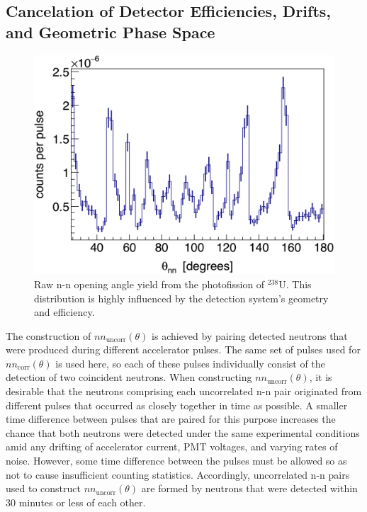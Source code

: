 \subsection{Cancelation of Detector Efficiencies, Drifts, and Geometric Phase Space}
\label{subsec:SPDPCancelation}
\begin{figure}[h]
\includegraphics[width=\figsize\textwidth]{./DetAcceptance.png}
\caption{Raw n-n opening angle yield from the photofission of $^{238}$U. 
This distribution is highly influenced by the detection system's geometry and efficiency.
}
\label{fig:DetAcceptance}
\end{figure}

The construction of $nn_{\text{uncorr}}(\theta)$ is achieved by pairing detected neutrons that were produced during different accelerator pulses.
The same set of pulses used for $nn_{\text{corr}}(\theta)$ is used here, so each of these pulses individually consist of the detection of two coincident neutrons.
When constructing $nn_{\text{uncorr}}(\theta)$, it is desirable that the neutrons comprising each uncorrelated n-n pair originated from different pulses that occurred as closely together in time as possible.
A smaller time difference between pulses that are paired for this purpose increases the chance that both neutrons were detected under the same experimental conditions amid any drifting of accelerator current, PMT voltages, and varying rates of noise.
However, some time difference between the pulses must be allowed so as not to cause insufficient counting statistics.
Accordingly, uncorrelated n-n pairs used to construct $nn_{\text{uncorr}}(\theta)$ are formed by neutrons that were detected within 30 minutes or less of each other.


